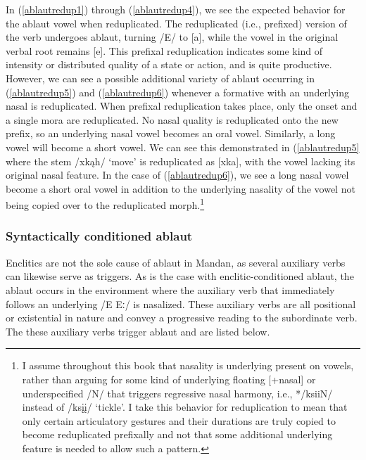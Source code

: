 In (\ref{ablautredup1}) through (\ref{ablautredup4}), we see the expected behavior for the ablaut vowel when reduplicated. The reduplicated (i.e., prefixed) version of the verb undergoes ablaut, turning /E/ to [a], while the vowel in the original verbal root remains [e]. This prefixal reduplication indicates some kind of intensity or distributed quality of a state or action, and is quite productive. However,  we can see a possible additional variety of ablaut occurring in (\ref{ablautredup5}) and (\ref{ablautredup6}) whenever a formative with an underlying nasal is reduplicated. When prefixal reduplication takes place, only the onset and a single mora are reduplicated. No nasal quality is reduplicated onto the new prefix, so an underlying nasal vowel becomes an oral vowel. Similarly, a long vowel will become a short vowel. We can see this demonstrated in (\ref{ablautredup5} where the stem /xkąh/ `move' is reduplicated as [xka], with the vowel lacking its original nasal feature. In the case of (\ref{ablautredup6}), we see a long nasal vowel become a short oral vowel in addition to the underlying nasality of the vowel not being copied over to the reduplicated morph.\footnote{I assume throughout this book that nasality is underlying present on vowels, rather than arguing for some kind of underlying floating [+nasal] or underspecified /N/ that triggers regressive nasal harmony, i.e., */ksiiN/ instead of /ksįį/ `tickle'. I take this behavior for reduplication to mean that only certain articulatory gestures and their durations are truly copied to become reduplicated prefixally and not that some additional underlying feature is needed to allow such a pattern.}

\subsubsection{Syntactically conditioned ablaut}\label{syntacticallyconditionedablaut}

Enclitics are not the sole cause of ablaut in Mandan, as several auxiliary verbs can likewise serve as triggers. As is the case with enclitic-conditioned ablaut, the ablaut occurs in the environment where the auxiliary verb that immediately follows an underlying /E Eː/ is nasalized. These auxiliary verbs are all positional or existential in nature and convey a progressive reading to the subordinate verb. The these auxiliary verbs trigger ablaut and are listed below.


